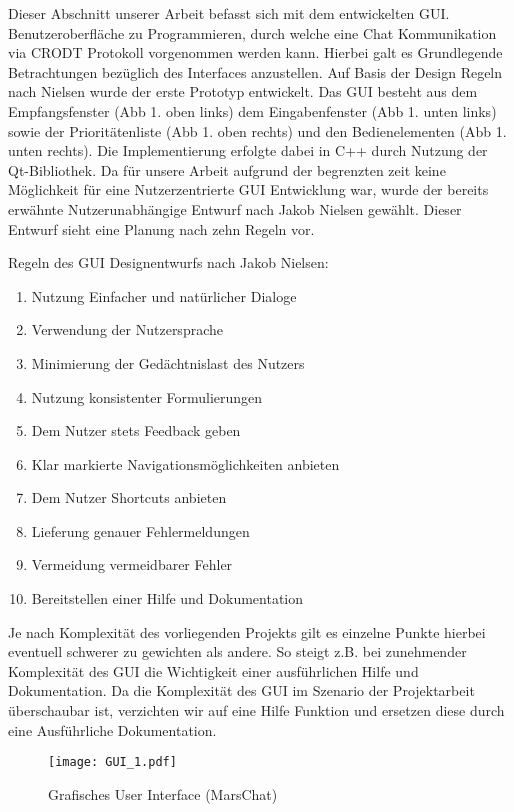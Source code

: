 Dieser Abschnitt unserer Arbeit befasst sich mit dem entwickelten
GUI. Benutzeroberfl{\"a}che zu Programmieren, durch welche eine Chat
Kommunikation via CRODT Protokoll vorgenommen werden kann. Hierbei galt es
Grundlegende Betrachtungen bez{\"u}glich des Interfaces anzustellen. Auf Basis
der Design Regeln nach Nielsen wurde der erste Prototyp entwickelt. Das GUI
besteht aus dem Empfangsfenster (Abb 1. oben links) dem Eingabenfenster (Abb 1.
unten links) sowie der Priorit{\"a}tenliste (Abb 1. oben rechts) und den
Bedienelementen (Abb 1. unten rechts). Die Implementierung erfolgte dabei in
C++ durch Nutzung der Qt-Bibliothek. Da f{\"u}r unsere Arbeit aufgrund der
begrenzten zeit keine M{\"o}glichkeit f{\"u}r eine Nutzerzentrierte GUI
Entwicklung war, wurde der bereits erw{\"a}hnte Nutzerunabh{\"a}ngige Entwurf
nach Jakob Nielsen gew{\"a}hlt. Dieser Entwurf sieht eine Planung nach zehn
Regeln vor.

Regeln des GUI Designentwurfs nach Jakob Nielsen:

   \begin{enumerate}[I]
     \item Nutzung Einfacher und nat{\"u}rlicher Dialoge
     \item Verwendung der Nutzersprache
     \item Minimierung der Ged{\"a}chtnislast des Nutzers
     \item Nutzung konsistenter Formulierungen
     \item Dem Nutzer stets Feedback geben
     \item Klar markierte Navigationsm{\"o}glichkeiten anbieten
     \item Dem Nutzer Shortcuts anbieten
     \item Lieferung genauer Fehlermeldungen
     \item Vermeidung vermeidbarer Fehler
     \item Bereitstellen einer Hilfe und Dokumentation
   \end{enumerate}

Je nach Komplexit{\"a}t des vorliegenden Projekts gilt es einzelne Punkte
hierbei eventuell schwerer zu gewichten als andere. So steigt z.B. bei
zunehmender Komplexit{\"a}t des GUI die Wichtigkeit einer ausf{\"u}hrlichen
Hilfe und Dokumentation. Da die Komplexit{\"a}t des GUI im Szenario der
Projektarbeit {\"u}berschaubar ist, verzichten wir auf eine Hilfe Funktion und
ersetzen diese durch eine Ausf{\"u}hrliche Dokumentation.

\begin{figure}[H]
\centering
\texttt{[image: GUI\_1.pdf]}
\caption{Grafisches User Interface (MarsChat)}
\label{fig:Grafisches User Interface}
\end{figure}

